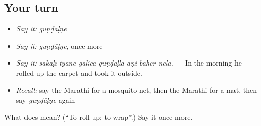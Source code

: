 \subsection*{Your turn}
\begin{itemize}
\raggedright
  \item \emph{Say it:} \emph{guṇḍāḷṇe}
  \item \emph{Say it:} \emph{guṇḍāḷṇe}, once more
  \item \emph{Say it:} \emph{sakāḷī tyāne gālicā guṇḍāḷlā āṇi bāher nelā.} — In the morning he rolled up the carpet and took it outside.
  \item \emph{Recall:} say the Marathi for a mosquito net, then the Marathi for a mat, then say \emph{guṇḍāḷṇe} again
\end{itemize}

\begin{tcolorbox}[breakable,colback=teal!4,colframe=teal!35!black,title={Before you move on}]
What does  mean? (\textquotedblleft{}To roll up; to wrap\textquotedblright{}.) Say it once more.
\end{tcolorbox}
